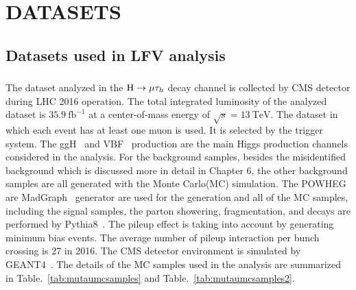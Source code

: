 
\chapter{DATASETS}
\section{Datasets used in LFV analysis}
\subsection{\Hmuhad}
The dataset analyzed in the $\mathrm{H}\to \mu\tau_{h}$ decay channel is collected by CMS detector during LHC 2016 operation. The total integrated luminosity of the analyzed dataset is $35.9 ~\textrm{fb}^{-1} $ at a center-of-mass energy of $ \sqrt{s}=13 ~\textrm{TeV} $. The dataset in which each event has at least one muon is used. It is selected by the trigger system. The ggH~\cite{Georgi:1977gs} and VBF~\cite{Cahn:1986zv} production are the main Higgs production channels considered in the analysis. For the background samples, besides the misidentified background which is discussed more in detail in Chapter 6, the other background samples are all generated with the Monte Carlo(MC) simulation. The POWHEG~\cite{POWHEG-BOX} are MadGraph~\cite{Alwall:2014} generator are used for the generation and all of the MC samples, including the signal samples, the parton showering, fragmentation, and decays are performed by Pythia8~\cite{Sjostrand:2014zea}.  The pileup effect is taking into account by generating minimum bias events. The average number of pileup interaction per bunch crossing is 27 in 2016. The CMS detector environment is simulated by GEANT4~\cite{GEANT4}. The details of the MC samples used in the analysis are summarized in Table.~\ref{tab:mutaumcsamples} and Table.~\ref{tab:mutaumcsamples2}.

